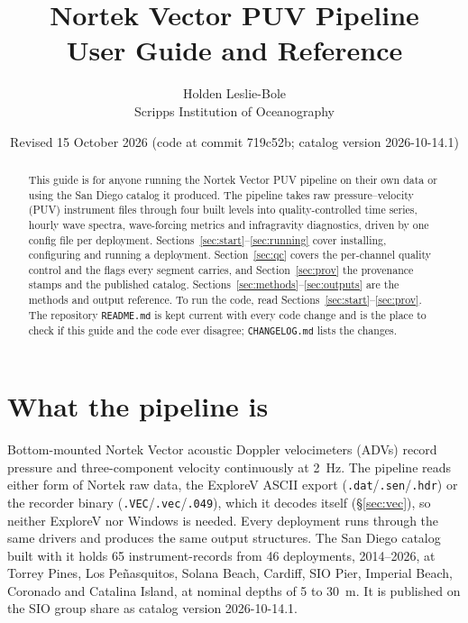 \documentclass[11pt]{article}
\title{\textbf{Nortek Vector PUV Pipeline}\\[2pt]
       \large User Guide and Reference}
\author{Holden Leslie-Bole \\ Scripps Institution of Oceanography}
\date{Revised 15 October 2026 (code at commit 719c52b; catalog version 2026-10-14.1)}
\newcommand{\code}[1]{\texttt{#1}}
\begin{document}
\maketitle

\begin{abstract}
\noindent
This guide is for anyone running the Nortek Vector PUV pipeline on their own data or using
the San Diego catalog it produced. The pipeline takes raw pressure--velocity (PUV) instrument
files through four built levels into quality-controlled time series, hourly wave spectra,
wave-forcing metrics and infragravity diagnostics, driven by one config file per deployment.
Sections~\ref{sec:start}--\ref{sec:running} cover installing, configuring and running a
deployment. Section~\ref{sec:qc} covers the per-channel quality control and the flags every
segment carries, and Section~\ref{sec:prov} the provenance stamps and the published catalog.
Sections~\ref{sec:methods}--\ref{sec:outputs} are the methods and output reference. To run the
code, read Sections~\ref{sec:start}--\ref{sec:prov}. The repository \code{README.md} is kept
current with every code change and is the place to check if this guide and the code ever
disagree; \code{CHANGELOG.md} lists the changes.
\end{abstract}

\tableofcontents
\newpage

\section{What the pipeline is}
\label{sec:intro}

Bottom-mounted Nortek Vector acoustic Doppler velocimeters (ADVs) record pressure and
three-component velocity continuously at 2~Hz. The pipeline reads either form of Nortek raw
data, the ExploreV ASCII export (\code{.dat}/\code{.sen}/\code{.hdr}) or the recorder binary
(\code{.VEC}/\code{.vec}/\code{.049}), which it decodes itself (\S\ref{sec:vec}), so neither
ExploreV nor Windows is needed. Every deployment runs through the same drivers and produces
the same output structures. The San Diego catalog built with it holds 65 instrument-records
from 46 deployments, 2014--2026, at Torrey Pines, Los Pe\~nasquitos, Solana Beach, Cardiff,
SIO Pier, Imperial Beach, Coronado and Catalina Island, at nominal depths of 5 to 30~m. It is
published on the SIO group share as catalog version 2026-10-14.1.
\end{document}
